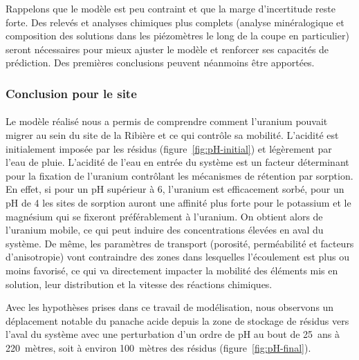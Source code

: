 \documentclass{article}
\newcommand{\blue}[1]{\textcolor{blue}{#1}} %
\begin{document}
Rappelons que le modèle est peu contraint et que la marge d'incertitude reste forte. Des relevés et analyses chimiques plus complets (analyse minéralogique et composition des solutions dans les piézomètres le long de la coupe en particulier) seront nécessaires pour mieux ajuster le modèle et renforcer ses capacités de prédiction.
Des premières conclusions peuvent néanmoins être apportées.

\subsubsection{Conclusion pour le site}
\paragraph{} Le modèle réalisé nous a permis de comprendre comment l’uranium pouvait migrer au sein du site de la Ribière et ce qui contrôle sa mobilité. L'acidité est initialement imposée par les résidus (figure~\ref{fig:pH-initial}) et légèrement par l'eau de pluie. L’acidité de l’eau en entrée du système est un facteur déterminant pour la fixation de l’uranium contrôlant les mécanismes de rétention par sorption. En effet, si pour un pH supérieur à 6, l’uranium est efficacement sorbé, pour un pH de 4 les sites de sorption auront une affinité plus forte pour le potassium et le magnésium qui se fixeront préférablement à l'uranium. On obtient alors de l'uranium mobile, ce qui peut induire des concentrations élevées en aval du système. De même, les paramètres de transport (porosité, perméabilité et facteurs d'anisotropie) vont contraindre des zones dans lesquelles l’écoulement est plus ou moins favorisé, ce qui va directement impacter la mobilité des éléments mis en solution, leur distribution et la vitesse des réactions chimiques. 


Avec les hypothèses prises dans ce travail de modélisation, nous observons un déplacement notable du panache acide depuis la zone de stockage de résidus vers l’aval du système avec une perturbation d’un ordre de pH au bout de 25~ans à 220~mètres, soit à environ 100~mètres des résidus (figure~\ref{fig:pH-final}). 
 
\end{document}

